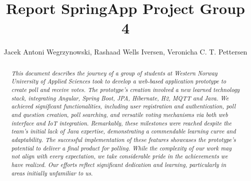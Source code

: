 \documentclass[11pt]{article}
\begin{document}
\title{Report SpringApp Project Group 4}

\author{Jacek Antoni Wegrzynowski, Rashaad Wells Iversen, Veronicha C. T. Pettersen }

\maketitle

\begin{abstract}

\noindent \textit{This document describes the journey of a group of students at Western Norway University of Applied Sciences took to develop a web-based application prototype to create poll and receive votes.  The prototype's creation involved a new learned technology stack, integrating Angular, Spring Boot, JPA, Hibernate, H2, MQTT and Java.  We achieved significant functionalities, including user registration and authentication, poll and question creation, poll searching, and versatile voting mechanisms via both web interface and IoT integration.  Remarkably, these milestones were reached despite the team's initial lack of Java expertise, demonstrating a commendable learning curve and adaptability.  The successful implementation of these features showcases the prototype's potential to deliver a final product for polling.  While the complexity of our work may not align with every expectation, we take considerable pride in the achievements we have realized.  Our efforts reflect significant dedication and learning, particularly in areas initially unfamiliar to us.}

\end{abstract}

%















{}
\end{document}
